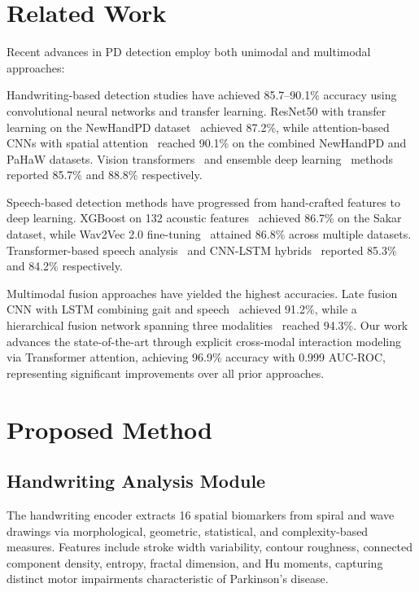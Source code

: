 \documentclass[10pt,conference,letterpaper]{IEEEtran}
\begin{document}
\section{Related Work}

Recent advances in PD detection employ both unimodal and multimodal approaches:

Handwriting-based detection studies have achieved 85.7--90.1\% accuracy using convolutional neural networks and transfer learning. ResNet50 with transfer learning on the NewHandPD dataset~\cite{ref1} achieved 87.2\%, while attention-based CNNs with spatial attention~\cite{ref6} reached 90.1\% on the combined NewHandPD and PaHaW datasets. Vision transformers~\cite{ref3} and ensemble deep learning~\cite{ref4} methods reported 85.7\% and 88.8\% respectively.

Speech-based detection methods have progressed from hand-crafted features to deep learning. XGBoost on 132 acoustic features~\cite{ref12} achieved 86.7\% on the Sakar dataset, while Wav2Vec 2.0 fine-tuning~\cite{ref14} attained 86.8\% across multiple datasets. Transformer-based speech analysis~\cite{ref10} and CNN-LSTM hybrids~\cite{ref11} reported 85.3\% and 84.2\% respectively.

Multimodal fusion approaches have yielded the highest accuracies. Late fusion CNN with LSTM combining gait and speech~\cite{ref17} achieved 91.2\%, while a hierarchical fusion network spanning three modalities~\cite{ref20} reached 94.3\%. Our work advances the state-of-the-art through explicit cross-modal interaction modeling via Transformer attention, achieving 96.9\% accuracy with 0.999 AUC-ROC, representing significant improvements over all prior approaches.

\section{Proposed Method}

\subsection{Handwriting Analysis Module}

The handwriting encoder extracts 16 spatial biomarkers from spiral and wave drawings via morphological, geometric, statistical, and complexity-based measures. Features include stroke width variability, contour roughness, connected component density, entropy, fractal dimension, and Hu moments, capturing distinct motor impairments characteristic of Parkinson's disease.
\end{document}
